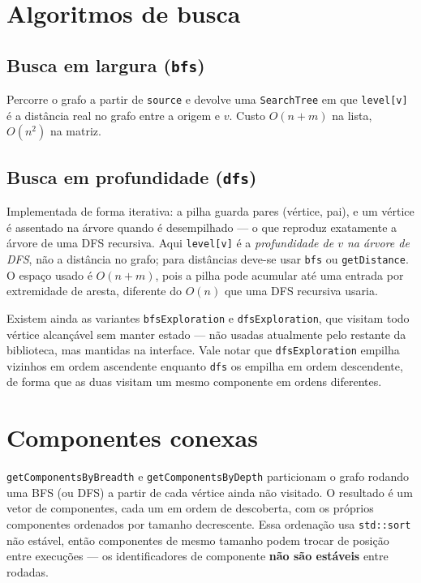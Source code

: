 \documentclass[a4paper,11pt]{article}
\begin{document}
\section{Algoritmos de busca}

\subsection{Busca em largura (\texttt{bfs})}

Percorre o grafo a partir de \texttt{source} e devolve uma
\texttt{SearchTree} em que \texttt{level[v]} é a distância real no grafo
entre a origem e $v$. Custo $O(n+m)$ na lista, $O(n^2)$ na matriz.

\subsection{Busca em profundidade (\texttt{dfs})}

Implementada de forma iterativa: a pilha guarda pares (vértice, pai), e um
vértice é assentado na árvore quando é desempilhado --- o que reproduz
exatamente a árvore de uma DFS recursiva. Aqui \texttt{level[v]} é a
\emph{profundidade de $v$ na árvore de DFS}, não a distância no grafo; para
distâncias deve-se usar \texttt{bfs} ou \texttt{getDistance}. O espaço
usado é $O(n+m)$, pois a pilha pode acumular até uma entrada por
extremidade de aresta, diferente do $O(n)$ que uma DFS recursiva usaria.

Existem ainda as variantes \texttt{bfsExploration} e
\texttt{dfsExploration}, que visitam todo vértice alcançável sem manter
estado --- não usadas atualmente pelo restante da biblioteca, mas
mantidas na interface. Vale notar que \texttt{dfsExploration} empilha
vizinhos em ordem ascendente enquanto \texttt{dfs} os empilha em ordem
descendente, de forma que as duas visitam um mesmo componente em ordens
diferentes.

\section{Componentes conexas}

\texttt{getComponentsByBreadth} e \texttt{getComponentsByDepth} particionam
o grafo rodando uma BFS (ou DFS) a partir de cada vértice ainda não
visitado. O resultado é um vetor de componentes, cada um em ordem de
descoberta, com os próprios componentes ordenados por tamanho
decrescente. Essa ordenação usa \texttt{std::sort} não estável, então
componentes de mesmo tamanho podem trocar de posição entre execuções ---
os identificadores de componente \textbf{não são estáveis} entre rodadas.
\end{document}
